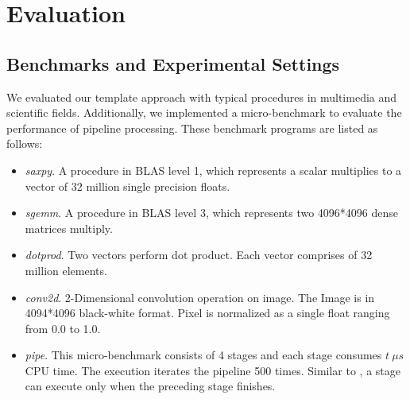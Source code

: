 \section{Evaluation}
\label{sec:eval}


\subsection{Benchmarks and Experimental Settings}

We evaluated our template approach with typical procedures
in multimedia and scientific fields. Additionally,
we implemented a micro-benchmark to evaluate the performance of
pipeline processing. These benchmark programs are listed
as follows:

\begin{itemize}
\item \textit{saxpy}. A procedure in BLAS level 1, which represents a
scalar multiplies to a vector of 32 million single precision floats.

\item \textit{sgemm}. A procedure in BLAS level 3, which represents
two 4096*4096 dense matrices multiply.

\item \textit{dotprod}. Two vectors perform dot product. Each vector
  comprises of 32 million elements.

\item \textit{conv2d}. 2-Dimensional convolution operation on image.  The Image
  is in 4094*4096 black-white format. Pixel is normalized as a single
  float ranging from 0.0 to 1.0.

\item \textit{pipe}.  This micro-benchmark consists of 4 stages
and each stage consumes $t \  \mu s$ CPU time. The execution iterates the
pipeline 500 times.  Similar to , a stage can execute only when the preceding stage
finishes.  


\end{itemize}


